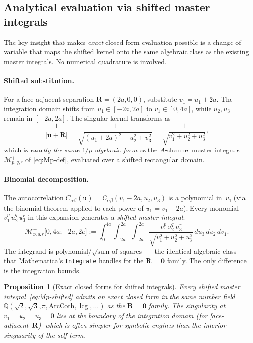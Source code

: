 \documentclass[11pt,a4paper]{article}
\newcommand{\bu}{\bm{u}}
\newcommand{\bR}{\bm{R}}
\theoremstyle{plain}
\newtheorem{proposition}[theorem]{Proposition}
\theoremstyle{definition}
\theoremstyle{remark}
\begin{document}
\subsection{Analytical evaluation via shifted master integrals}
\label{sec:shifted-master}

The key insight that makes \emph{exact} closed-form evaluation
possible is a change of variable that maps the shifted kernel onto
the same algebraic class as the existing master integrals.  No
numerical quadrature is involved.

\paragraph{Shifted substitution.}
For a face-adjacent separation $\bR = (2a, 0, 0)$, substitute
$v_1 = u_1 + 2a$.  The integration domain shifts from
$u_1 \in [-2a, 2a]$ to $v_1 \in [0, 4a]$, while $u_2, u_3$ remain
in $[-2a, 2a]$.  The singular kernel transforms as
\begin{equation}
  \frac{1}{|\bu + \bR|}
  = \frac{1}{\sqrt{(u_1 + 2a)^2 + u_2^2 + u_3^2}}
  = \frac{1}{\sqrt{v_1^2 + u_2^2 + u_3^2}},
  \label{eq:shifted-kernel}
\end{equation}
which is \emph{exactly the same $1/\rho$ algebraic form} as the
$A$-channel master integrals $\mathcal{M}^+_{p,q,r}$ of
\eqref{eq:Mp-def}, evaluated over a shifted rectangular domain.

\paragraph{Binomial decomposition.}
The autocorrelation $C_{\alpha\beta}(\bu) =
C_{\alpha\beta}(v_1 - 2a, u_2, u_3)$ is a polynomial in~$v_1$
(via the binomial theorem applied to each power of
$u_1 = v_1 - 2a$).  Every monomial
$v_1^p\,u_2^q\,u_3^r$ in this expansion generates a
\emph{shifted master integral}:
\begin{equation}
  \mathcal{M}^+_{p,q,r}\bigl[0, 4a; -2a, 2a\bigr]
  := \int_0^{4a}\!\!\int_{-2a}^{2a}\!\!\int_{-2a}^{2a}\!
  \frac{v_1^p\,u_2^q\,u_3^r}
    {\sqrt{v_1^2 + u_2^2 + u_3^2}}\,du_3\,du_2\,dv_1.
  \label{eq:Mp-shifted}
\end{equation}
The integrand is $\text{polynomial}/\sqrt{\text{sum of squares}}$ ---
the identical algebraic class that Mathematica's \texttt{Integrate}
handles for the $\bR = \bm{0}$ family.  The only difference is the
integration bounds.

\begin{proposition}[Exact closed forms for shifted integrals]
\label{prop:shifted-closed}
Every shifted master integral~\eqref{eq:Mp-shifted} admits an exact
closed form in the same number field
$\mathbb{Q}(\sqrt{2}, \sqrt{3}, \pi, \mathrm{ArcCoth}, \log,
\ldots)$ as the $\bR = \bm{0}$ family.  The singularity at
$v_1 = u_2 = u_3 = 0$ lies at the \emph{boundary} of the
integration domain (for face-adjacent~$\bR$), which is often
\emph{simpler} for symbolic engines than the interior singularity
of the self-term.
\end{proposition}
\end{document}
